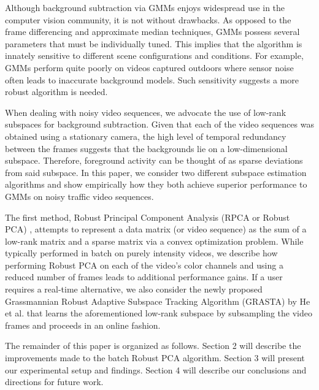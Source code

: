 \documentclass{article}
\begin{document}
Although background subtraction via GMMs enjoys widespread use in the computer vision community, it is not without drawbacks. As opposed to the frame differencing and approximate median techniques, GMMs possess several parameters that must be individually tuned. This implies that the algorithm is innately sensitive to different scene configurations and conditions. For example, GMMs perform quite poorly on videos captured outdoors where sensor noise often leads to inaccurate background models. Such sensitivity suggests a more robust algorithm is needed.


When dealing with noisy video sequences, we advocate the use of low-rank subspaces for background subtraction.  Given that each of the video sequences was obtained using a stationary camera, the high level of temporal redundancy between the frames suggests that the backgrounds lie on a low-dimensional subspace. Therefore, foreground activity can be thought of as sparse deviations from said subspace. In this paper, we consider two different subspace estimation algorithms and show empirically how they both achieve superior performance to GMMs on noisy traffic video sequences. 

The first method,  Robust Principal Component Analysis (RPCA or Robust PCA) \cite{RPCA09}, attempts to represent a data matrix (or video sequence) as the sum of a low-rank matrix and a sparse matrix via a convex optimization problem. While typically performed in batch on purely intensity videos, we describe how performing Robust PCA on each of the video's color channels and using a reduced number of frames leads to additional performance gains. If a user requires a real-time alternative, we also consider the newly proposed Grassmannian Robust Adaptive Subspace Tracking Algorithm (GRASTA) by He et al. \cite{GRASTA12} that learns the aforementioned low-rank subspace by subsampling the video frames and proceeds in an online fashion. 

The remainder of this paper is organized as follows. Section 2 will describe the improvements made to the batch Robust PCA algorithm. Section 3 will present our experimental setup and findings. Section 4 will describe our conclusions and directions for future work.
\end{document}
